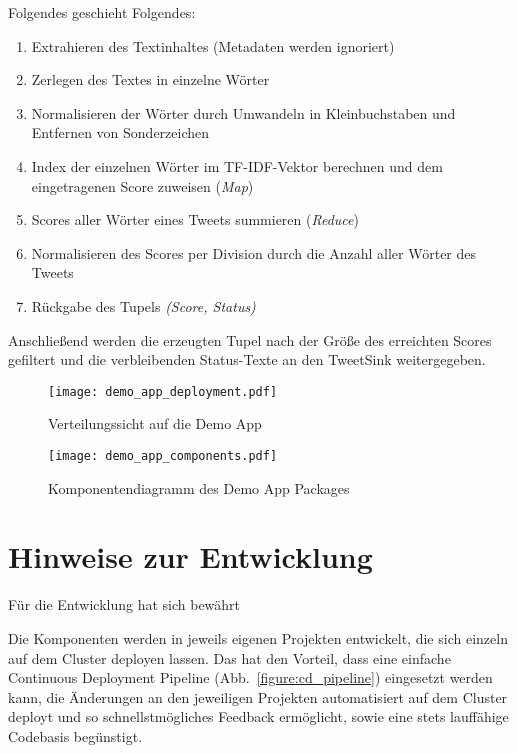 Folgendes geschieht Folgendes:
\begin{enumerate}
	\item Extrahieren des Textinhaltes (Metadaten werden ignoriert)
	\item Zerlegen des Textes in einzelne Wörter
	\item Normalisieren der Wörter durch Umwandeln in Kleinbuchstaben und Entfernen von Sonderzeichen
	\item Index der einzelnen Wörter im TF-IDF-Vektor berechnen und dem eingetragenen Score zuweisen (\textit{Map})
	\item Scores aller Wörter eines Tweets summieren (\textit{Reduce})
	\item Normalisieren des Scores per Division durch die Anzahl aller Wörter des Tweets
	\item Rückgabe des Tupels \textit{(Score, Status)}
\end{enumerate}

Anschließend werden die erzeugten Tupel nach der Größe des erreichten Scores gefiltert und die verbleibenden Status-Texte an den TweetSink weitergegeben.\\

\begin{figure}[ht!]
	\centering
  \texttt{[image: demo\_app\_deployment.pdf]}
	\caption{Verteilungssicht auf die Demo App}
	\label{figure:demo_app_verteilung}
\end{figure}


\begin{figure}[ht!]
	\centering
  \texttt{[image: demo\_app\_components.pdf]}
	\caption{Komponentendiagramm des Demo App Packages}
	\label{figure:demo_app_komponenten}
\end{figure}

\section{Hinweise zur Entwicklung}
Für die Entwicklung hat sich bewährt 

Die Komponenten werden in jeweils eigenen Projekten entwickelt, die sich einzeln auf dem Cluster deployen lassen. Das hat den Vorteil, dass eine einfache Continuous Deployment Pipeline (Abb.~\ref{figure:cd_pipeline}) eingesetzt werden kann, die Änderungen an den jeweiligen Projekten automatisiert auf dem Cluster deployt und so schnellstmögliches Feedback ermöglicht, sowie eine stets lauffähige Codebasis begünstigt.\\

